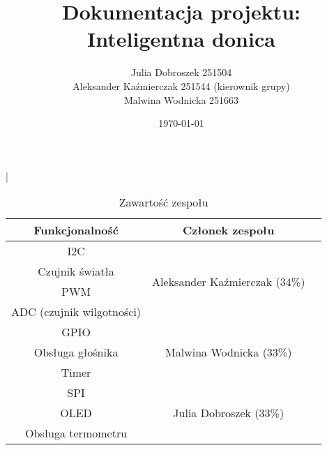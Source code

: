 \documentclass{article}
\title{Dokumentacja projektu: Inteligentna donica}
\author{
  Julia Dobroszek 251504 \\
  Aleksander Kaźmierczak 251544 (kierownik grupy)\\
  Malwina Wodnicka 251663 \\  
}
\date{\today}
\begin{document}
\maketitle

|%
    



\begin{table}[H]
    \centering
    \renewcommand{\arraystretch}{1.3}
    \begin{tabular}{|c|c|>{\centering\arraybackslash}m{4.5cm}|}
    \rowcolor{gray!30}
    \hline
    Funkcjonalność & Członek zespołu\\
    \hline
    I2C & \multirow[c]{4}{*}{Aleksander Kaźmierczak (34\%)} \\
    
    Czujnik światła& \\
  
    PWM&\\
    
    ADC (czujnik wilgotności)&\\
    \hline
    GPIO & \multirow[c]{3}{*}{Malwina Wodnicka (33\%)} \\
    
    Obsługa głośnika&\\
    
    Timer&\\
    \hline
    SPI & \multirow[c]{3}{*}{Julia Dobroszek (33\%)} \\
    
    OLED & \\
    
    Obsługa termometru&\\
    \hline
    \end{tabular}
    \caption{Zawartość zespołu}
\end{table}
\end{document}
